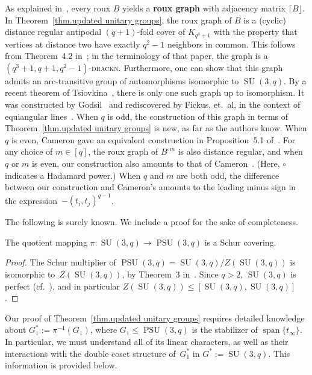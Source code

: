 \begin{remark}
As explained in~\cite{IversonM:18}, every roux $B$ yields a \textbf{roux graph} with adjacency matrix $\lceil B \rfloor$.
In Theorem~\ref{thm.updated unitary groups}, the roux graph of $B$ is a (cyclic) distance regular antipodal $(q+1)$-fold cover of $K_{q^3+1}$ with the property that vertices at distance two have exactly $q^2-1$ neighbors in common.
This follows from Theorem~4.2 in~\cite{IversonM:18}; in the terminology of that paper, the graph is a $(q^3+1,q+1,q^2-1)$-\textsc{drackn}.
Furthermore, one can show that this graph admits an arc-transitive group of automorphisms isomorphic to $\operatorname{SU}(3,q)$.
By a recent theorem of Tsiovkina~\cite[Theorem~5.11]{Tsiovkina:22}, there is only one such graph up to isomorphism.
It was constructed by Godsil~\cite{Godsil:92} and rediscovered by Fickus, et.~al, in the context of equiangular lines~\cite{FickusJMPW:17}.
When $q$ is odd, the construction of this graph in terms of Theorem~\ref{thm.updated unitary groups} is new, as far as the authors know.
When $q$ is even, Cameron gave an equivalent construction in Proposition~5.1 of~\cite{Cameron:91}.
For any choice of $m \in [q]$, the roux graph of $B^{\circ m}$ is also distance regular, and when $q$ or $m$ is even, our construction also amounts to that of Cameron~\cite{Cameron:91}.
(Here, $\circ$ indicates a Hadamard power.)
When $q$ and $m$ are both odd, the difference between our construction and Cameron's amounts to the leading minus sign in the expression~$-(t_i,t_j)^{q-1}$.
\end{remark}


The following is surely known.
We include a proof for the sake of completeness.

\begin{proposition}
The quotient mapping $\pi \colon \operatorname{SU}(3,q) \to \operatorname{PSU}(3,q)$ is a Schur covering.
\end{proposition}

\begin{proof}
The Schur multiplier of $\operatorname{PSU}(3,q) = \operatorname{SU}(3,q)/Z(\operatorname{SU}(3,q))$ is isomorphic to~$Z(\operatorname{SU}(3,q))$, by Theorem~3 in~\cite{Griess:73}.
Since $q > 2$, $\operatorname{SU}(3,q)$ is perfect (cf.~\cite[Theorem~11.22]{Grove:02}), and in particular $Z(\operatorname{SU}(3,q)) \leq [\operatorname{SU}(3,q),\operatorname{SU}(3,q)]$.
\end{proof}

Our proof of Theorem~\ref{thm.updated unitary groups} requires detailed knowledge about $G_1^* := \pi^{-1}(G_1)$, where $G_1 \leq \operatorname{PSU}(3,q)$ is the stabilizer of $\operatorname{span}\{ t_\infty \}$.
In particular, we must understand all of its linear characters, as well as their interactions with the double coset structure of~$G_1^*$ in $G^*:= \operatorname{SU}(3,q)$.
This information is provided below.

